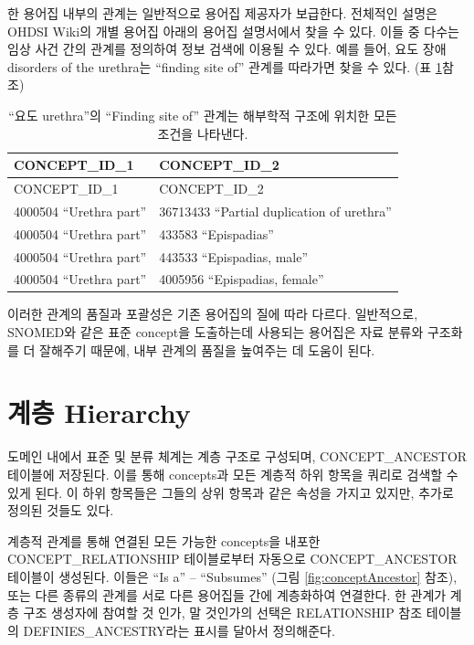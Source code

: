 \documentclass[11pt]{book}
\theoremstyle{definition}
\theoremstyle{definition}
\theoremstyle{definition}
\theoremstyle{remark}
\begin{document}
한 용어집 내부의 관계는 일반적으로 용어집 제공자가 보급한다. 전체적인
설명은 OHDSI Wiki의 개별 용어집 아래의 용어집 설명서에서 찾을 수 있다.
이들 중 다수는 임상 사건 간의 관계를 정의하여 정보 검색에 이용될 수
있다. 예를 들어, 요도 장애 disorders of the urethra는 ``finding site
of'' 관계를 따라가면 찾을 수 있다. (표 \ref{tab:findingSite}참조)

\begin{longtable}[]{@{}ll@{}}
\caption{\label{tab:findingSite} ``요도 urethra''의 ``Finding site of''
관계는 해부학적 구조에 위치한 모든 조건을 나타낸다.}\tabularnewline
\toprule
CONCEPT\_ID\_1 & CONCEPT\_ID\_2\tabularnewline
\midrule
\endfirsthead
\toprule
CONCEPT\_ID\_1 & CONCEPT\_ID\_2\tabularnewline
\midrule
\endhead
4000504 ``Urethra part'' & 36713433 ``Partial duplication of
urethra''\tabularnewline
4000504 ``Urethra part'' & 433583 ``Epispadias''\tabularnewline
4000504 ``Urethra part'' & 443533 ``Epispadias, male''\tabularnewline
4000504 ``Urethra part'' & 4005956 ``Epispadias, female''\tabularnewline
\bottomrule
\end{longtable}

이러한 관계의 품질과 포괄성은 기존 용어집의 질에 따라 다르다.
일반적으로, SNOMED와 같은 표준 concept을 도출하는데 사용되는 용어집은
자료 분류와 구조화를 더 잘해주기 때문에, 내부 관계의 품질을 높여주는 데
도움이 된다.

\section{계층 Hierarchy}\label{conceptAncestor}

도메인 내에서 표준 및 분류 체계는 계층 구조로 구성되며,
CONCEPT\_ANCESTOR 테이블에 저장된다. 이를 통해 concepts과 모든 계층적
하위 항목을 쿼리로 검색할 수 있게 된다. 이 하위 항목들은 그들의 상위
항목과 같은 속성을 가지고 있지만, 추가로 정의된 것들도 있다.

계층적 관계를 통해 연결된 모든 가능한 concepts을 내포한
CONCEPT\_RELATIONSHIP 테이블로부터 자동으로 CONCEPT\_ANCESTOR 테이블이
생성된다. 이들은 ``Is a'' -- ``Subsumes'' (그림
\ref{fig:conceptAncestor} 참조), 또는 다른 종류의 관계를 서로 다른
용어집들 간에 계층화하여 연결한다. 한 관계가 계층 구조 생성자에 참여할
것 인가, 말 것인가의 선택은 RELATIONSHIP 참조 테이블의
DEFINIES\_ANCESTRY라는 표시를 달아서 정의해준다.
\end{document}
